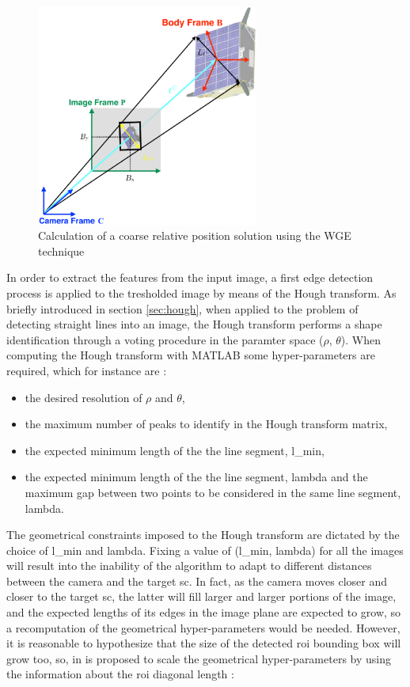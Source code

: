 \begin{figure}[htbp]
  \centering
  \includegraphics[width=0.65\textwidth]{gfx/coarsePoseEstimation.eps}
  \caption{Calculation of a coarse relative position solution using the WGE
    technique \cite{Sharma2018}}
  \label{fig:imageProcessingSubsystem}
\end{figure}

In order to extract the features from the input image, a first edge detection process is applied to the tresholded image by means of the Hough transform. As briefly introduced in section \ref{sec:hough}, when applied to the problem of detecting straight lines into an image, the Hough transform performs a shape identification through a voting procedure in the paramter space ($\rho$, $\theta$).
When computing the Hough transform with MATLAB some hyper-parameters are required, which for instance are :

\begin{itemize}
  \item the desired resolution of $\rho$ and $\theta$,
  \item the maximum number of peaks to identify in the Hough transform matrix,
  \item the expected minimum length of the the line segment, \gls{l_min},
  \item the expected minimum length of the the line segment, \gls{lambda} and the maximum gap between two points to be considered in the same line segment, \gls{lambda}.
\end{itemize}

The geometrical constraints imposed to the Hough transform are dictated by the choice of \gls{l_min} and \gls{lambda}. Fixing a value of (\gls{l_min}, \gls{lambda}) for all the images will result into the inability of the algorithm to adapt to different distances between the camera and the target \acrshort{sc}. In fact, as the camera moves closer and closer to the target \acrshort{sc}, the latter will fill larger and larger portions of the image, and the expected lengths of its edges in the image plane are expected to grow, so a recomputation of the geometrical hyper-parameters would be needed. However, it is reasonable to hypothesize that the size of the detected \acrshort{roi} bounding box will grow too, so, in \cite{Sharma2018} is proposed to scale the geometrical hyper-parameters by using the information about the \acrshort{roi} diagonal length :

